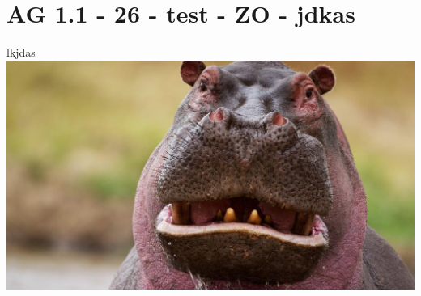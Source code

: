 \section{AG 1.1 - 26 - test - ZO - jdkas}

\begin{beispiel}[AG 1.1]{1}
lkjdas \includegraphics{../Beispieleinreichung/Bilder/AG11_26_hippo.eps}
\end{beispiel}